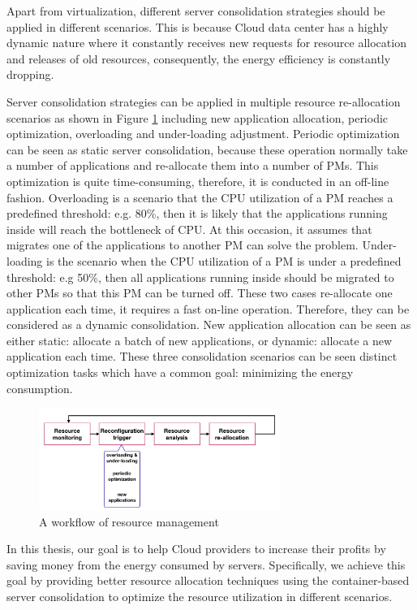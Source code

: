Apart from virtualization, different server consolidation strategies should be applied in different scenarios. This is because Cloud data center has a highly dynamic nature where it constantly receives new requests for resource allocation and releases of old resources, consequently, the energy efficiency is constantly dropping.

Server consolidation strategies can be applied in multiple resource re-allocation scenarios as shown in Figure \ref{fig:workflow} including new application allocation, periodic
optimization, overloading and under-loading adjustment.
Periodic optimization can be seen as static server consolidation, because these operation normally take a number of applications and re-allocate them into a number of PMs. This optimization is quite time-consuming, therefore, it is conducted in an off-line fashion. Overloading is a scenario that the CPU utilization of a PM reaches a predefined threshold: e.g. 80\%, then it is likely that the applications running inside will reach the bottleneck of CPU. At this occasion, it assumes that migrates one of the applications to another PM can solve the problem. Under-loading is the scenario when the CPU utilization of a PM is under a predefined threshold: e.g 50\%, then all applications running inside should be migrated to other PMs so that this PM can be turned off. These two cases re-allocate one application each time, it requires a fast on-line operation. Therefore, they can be considered as a dynamic consolidation. New application allocation can be seen as either static: allocate a batch of new applications, or dynamic: allocate a new application each time. These three consolidation scenarios can be seen distinct
optimization tasks which have a common goal: minimizing the energy consumption. 


\begin{figure}
	\centering
	\includegraphics[width=0.7\textwidth]{pics/workflow_management.png}
	\caption{A workflow of resource management \cite{Mishra:2012kx}}
	\label{fig:workflow}
\end{figure}
In this thesis, our goal is to help Cloud providers to increase their profits by saving money from the energy consumed by servers.
Specifically, we achieve this goal by providing better resource allocation techniques using the container-based server consolidation to optimize the resource utilization in different scenarios.

